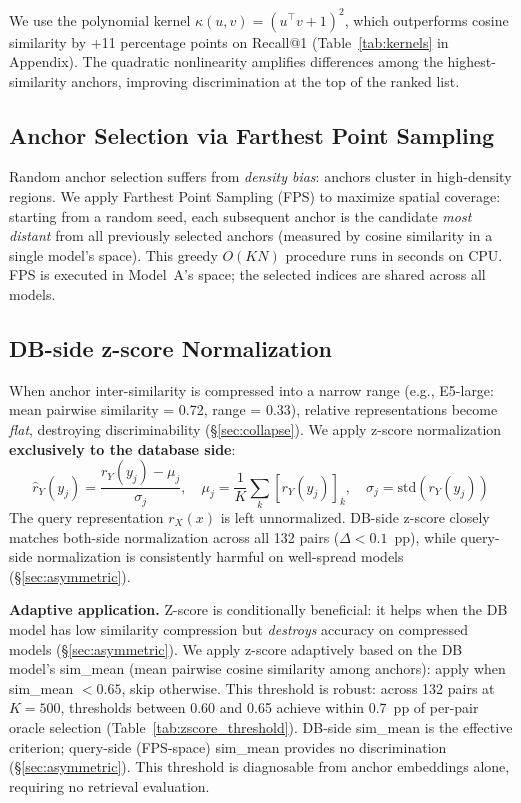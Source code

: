 \documentclass{article}
\begin{document}
We use the polynomial kernel $\kappa(u, v) = (u^\top v + 1)^2$, which outperforms cosine similarity by +11 percentage points on Recall@1 (Table~\ref{tab:kernels} in Appendix). The quadratic nonlinearity amplifies differences among the highest-similarity anchors, improving discrimination at the top of the ranked list.

\subsection{Anchor Selection via Farthest Point Sampling}

Random anchor selection suffers from \emph{density bias}: anchors cluster in high-density regions. We apply Farthest Point Sampling (FPS) to maximize spatial coverage: starting from a random seed, each subsequent anchor is the candidate \emph{most distant} from all previously selected anchors (measured by cosine similarity in a single model's space). This greedy $O(KN)$ procedure runs in seconds on CPU. FPS is executed in Model~A's space; the selected indices are shared across all models.

\subsection{DB-side z-score Normalization}

When anchor inter-similarity is compressed into a narrow range (e.g., E5-large: mean pairwise similarity = 0.72, range = 0.33), relative representations become \emph{flat}, destroying discriminability (\S\ref{sec:collapse}). We apply z-score normalization \textbf{exclusively to the database side}:
\begin{equation}
  \hat{r}_Y(y_j) = \frac{r_Y(y_j) - \mu_j}{\sigma_j}, \quad \mu_j = \frac{1}{K}\sum_k [r_Y(y_j)]_k, \quad \sigma_j = \mathrm{std}(r_Y(y_j))
\end{equation}
The query representation $r_X(x)$ is left unnormalized. DB-side z-score closely matches both-side normalization across all 132 pairs ($\Delta < 0.1$~pp), while query-side normalization is consistently harmful on well-spread models (\S\ref{sec:asymmetric}).

\textbf{Adaptive application.} Z-score is conditionally beneficial: it helps when the DB model has low similarity compression but \emph{destroys} accuracy on compressed models (\S\ref{sec:asymmetric}). We apply z-score adaptively based on the DB model's sim\_mean (mean pairwise cosine similarity among anchors): apply when sim\_mean $< 0.65$, skip otherwise. This threshold is robust: across 132 pairs at $K{=}500$, thresholds between 0.60 and 0.65 achieve within 0.7~pp of per-pair oracle selection (Table~\ref{tab:zscore_threshold}). DB-side sim\_mean is the effective criterion; query-side (FPS-space) sim\_mean provides no discrimination (\S\ref{sec:asymmetric}). This threshold is diagnosable from anchor embeddings alone, requiring no retrieval evaluation.
\end{document}

